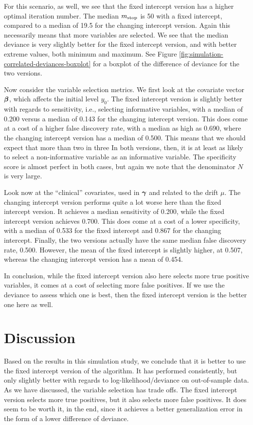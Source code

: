 For this scenario, as well, we see that the fixed intercept version has a higher optimal iteration number.
The median $m_{\text{stop}}$ is 50 with a fixed intercept, compared to a median of 19.5 for the changing intercept version.
Again this necessarily means that more variables are selected.
We see that the median deviance is very slightly better for the fixed intercept version, and with better extreme values, both minimum and maximum.
See Figure \ref{fig:simulation-correlated-deviances-boxplot} for a boxplot of the difference of deviance for the two versions.

Now consider the variable selection metrics.
We first look at the covariate vector $\boldsymbol{\beta}$, which affects the initial level $y_0$.
The fixed intercept version is slightly better with regards to sensitivity, i.e., selecting informative variables, with a median of 0.200 versus a median of 0.143 for the changing intercept version.
This does come at a cost of a higher false discovery rate, with a median as high as 0.690, where the changing intercept version has a median of 0.500.
This means that we should expect that more than two in three 
In both versions, then, it is at least as likely to select a non-informative variable as an informative variable.
The specificity score is almost perfect in both cases, but again we note that the denominator $N$ is very large.

Look now at the ``clinical'' covariates, used in $\boldsymbol{\gamma}$ and related to the drift $\mu$.
The changing intercept version performs quite a lot worse here than the fixed intercept version.
It achieves a median sensitivity of 0.200, while the fixed intercept version achieves 0.700.
This does come at a cost of a lower specificity, with a median of 0.533 for the fixed intercept and 0.867 for the changing intercept.
Finally, the two versions actually have the same median false discovery rate, 0.500.
However, the mean of the fixed intercept is slightly higher, at 0.507, whereas the changing intercept version has a mean of 0.454.

In conclusion, while the fixed intercept version also here selects more true positive variables, it comes at a cost of selecting more false positives.
If we use the deviance to assess which one is best, then the fixed intercept version is the better one here as well.

\section{Discussion}
Based on the results in this simulation study, we conclude that it is better to use the fixed intercept version of the algorithm.
It has performed consistently, but only slightly better with regards to log-likelihood/deviance on out-of-sample data.
As we have discussed, the variable selection has trade offs.
The fixed intercept version selects more true positives, but it also selects more false positives.
It does seem to be worth it, in the end, since it achieves a better generalization error in the form of a lower difference of deviance.

